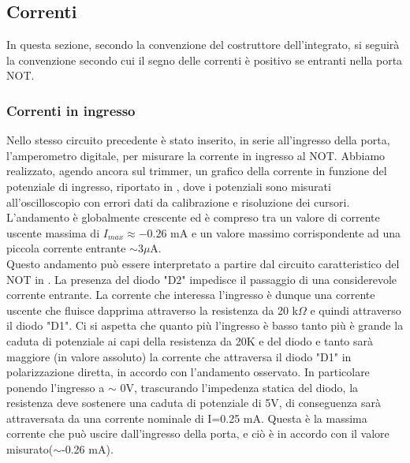 \subsection{Correnti}
In questa sezione, secondo la convenzione del costruttore dell'integrato, si seguirà la convenzione secondo cui il segno delle correnti è positivo se entranti nella porta NOT.\\
\subsubsection{Correnti in ingresso}
Nello stesso circuito precedente è stato inserito, in serie all'ingresso della porta, l'amperometro digitale, per misurare la corrente in ingresso al NOT.
Abbiamo realizzato, agendo ancora sul trimmer, un grafico della corrente in funzione del potenziale di ingresso, riportato in , dove i potenziali sono misurati all'oscilloscopio con errori dati da calibrazione e risoluzione dei cursori.\\
L'andamento è globalmente crescente  ed è  compreso tra un valore di corrente uscente massima di $I_{max}\approx -0.26$ mA e un valore massimo corrispondente ad una piccola corrente entrante $\sim 3 \mu$A. \\
Questo andamento può essere interpretato a partire dal circuito caratteristico del NOT in . La presenza del diodo "D2" impedisce il passaggio di una considerevole corrente entrante. La corrente che interessa l'ingresso è dunque una corrente uscente che fluisce dapprima attraverso la resistenza da 20 k$\Omega$ e quindi attraverso il diodo "D1". Ci si aspetta che quanto più l'ingresso è basso tanto più è grande la caduta di potenziale ai capi della resistenza da 20K e del diodo e tanto sarà maggiore (in valore assoluto) la corrente che attraversa il diodo "D1" in polarizzazione diretta, in accordo con l'andamento osservato. In particolare ponendo l'ingresso a $\sim$ 0V, trascurando l'impedenza statica del diodo, la resistenza deve sostenere una caduta di potenziale di 5V, di conseguenza sarà attraversata da una corrente nominale di I=0.25 mA. Questa è la massima corrente che può uscire dall'ingresso della porta, e ciò è in accordo con il valore misurato($\sim$-0.26 mA).\\
